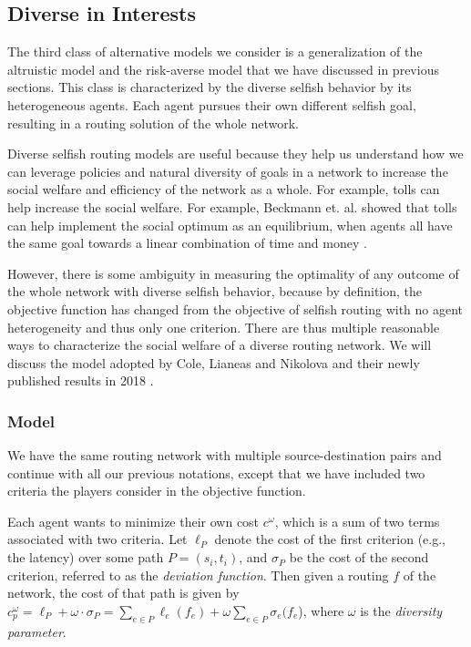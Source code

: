 \subsection{Diverse in Interests}\label{sec:diversity}

The third class of alternative models we consider is a generalization of the altruistic model and the risk-averse model that we have discussed in previous sections. This class is characterized by the diverse selfish behavior by its heterogeneous agents. Each agent pursues their own different selfish goal, resulting in a routing solution of the whole network. 

Diverse selfish routing models are useful because they help us understand how we can leverage policies and natural diversity of goals in a network to increase the social welfare and efficiency of the network as a whole. For example, tolls can help increase the social welfare. For example, Beckmann et. al. showed that tolls can help implement the social optimum as an equilibrium, when agents all have the same goal towards a linear combination of time and money \cite{beckmann1956studies}.

However, there is some ambiguity in measuring the optimality of any outcome of the whole network with diverse selfish behavior, because by definition, the objective function has changed from the objective of selfish routing with no agent heterogeneity and thus only one criterion. There are thus multiple reasonable ways to characterize the social welfare of a diverse routing network. We will discuss the model adopted by Cole, Lianeas and Nikolova and their newly published results in 2018 \cite{ijcai2018-24}.

\subsubsection{Model}

We have the same routing network with multiple source-destination pairs and continue with all our previous notations, except that we have included two criteria the players consider in the objective function.

Each agent wants to minimize their own cost $c^\omega$, which is a sum of two terms associated with two criteria. Let $\ell_P$ denote the cost of the first criterion (e.g., the latency) over some path $P=(s_i, t_i)$, and $\sigma_P$ be the cost of the second criterion, referred to as the {\it deviation function}. Then given a routing $f$ of the network, the cost of that path is given by $c^\omega_p = \ell_P+\omega\cdot \sigma_P=\sum_{e\in P} \ell_e(f_e)+ \omega\sum_{e\in P}\sigma_e(f_e$), where $\omega$ is the {\it diversity parameter}.

